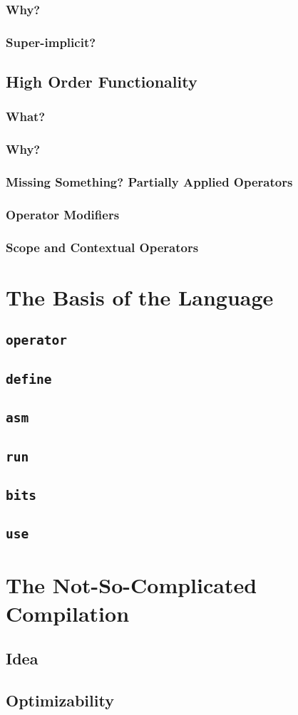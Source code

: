 \documentclass{article}
\newcommand{\secl}[1]{\section{#1}\label{sec:#1}}
\newcommand{\ssecl}[1]{\subsection{#1}\label{ssec:#1}}
\newcommand{\sssecl}[1]{\subsubsection{#1}\label{sssec:#1}}
\begin{document}
\sssecl{Why?}

\sssecl{Super-implicit?}

\ssecl{High Order Functionality}
\sssecl{What?}

\sssecl{Why?}

\sssecl{Missing Something? Partially Applied Operators}

\sssecl{Operator Modifiers}

\sssecl{Scope and Contextual Operators}

\secl{The Basis of the Language}
\ssecl{\texttt{\textbf{operator}}}

\ssecl{\texttt{\textbf{define}}}

\ssecl{\texttt{\textbf{asm}}}

\ssecl{\texttt{\textbf{run}}}

\ssecl{\texttt{\textbf{bits}}}

\ssecl{\texttt{\textbf{use}}}

\secl{The Not-So-Complicated Compilation}
\ssecl{Idea}

\ssecl{Optimizability}
\end{document}
